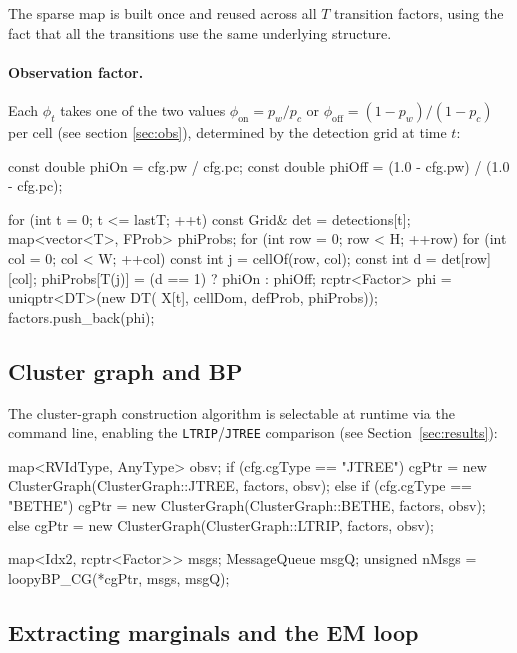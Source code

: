 \documentclass[11pt, a4paper]{article}
\begin{document}
\noindent The sparse map is built once and reused across all $T$ transition
factors, using the fact that all the transitions use the same underlying structure.

\paragraph{Observation factor.} Each $\phi_t$ takes one of the two values
$\phi_{\text{on}} = p_w/p_c$ or $\phi_{\text{off}} = (1{-}p_w)/(1{-}p_c)$
per cell (see section \ref{sec:obs}), determined by the detection grid at time $t$:

\begin{cppd}
const double phiOn  = cfg.pw / cfg.pc;
const double phiOff = (1.0 - cfg.pw) / (1.0 - cfg.pc);

for (int t = 0; t <= lastT; ++t) {
  const Grid& det = detections[t];
  map<vector<T>, FProb> phiProbs;
  for (int row = 0; row < H; ++row) {
    for (int col = 0; col < W; ++col) {
      const int j = cellOf(row, col);
      const int d = det[row][col];
      phiProbs[{T(j)}] = (d == 1) ? phiOn : phiOff;
    }
  }
  rcptr<Factor> phi = uniqptr<DT>(new DT(
      {X[t]}, {cellDom}, defProb, phiProbs));
  factors.push_back(phi);
}
\end{cppd}

\subsection{Cluster graph and BP}

The cluster-graph construction algorithm is selectable at runtime via the command line, enabling
the \texttt{LTRIP}/\texttt{JTREE} comparison (see Section~\ref{sec:results}):

\begin{cppd}
map<RVIdType, AnyType> obsv;  
if (cfg.cgType == "JTREE")
  cgPtr = new ClusterGraph(ClusterGraph::JTREE, factors, obsv);
else if (cfg.cgType == "BETHE")
  cgPtr = new ClusterGraph(ClusterGraph::BETHE, factors, obsv);
else
  cgPtr = new ClusterGraph(ClusterGraph::LTRIP, factors, obsv);

map<Idx2, rcptr<Factor>> msgs;  MessageQueue msgQ;
unsigned nMsgs = loopyBP_CG(*cgPtr, msgs, msgQ);
\end{cppd}

\subsection{Extracting marginals and the EM loop}
\end{document}
